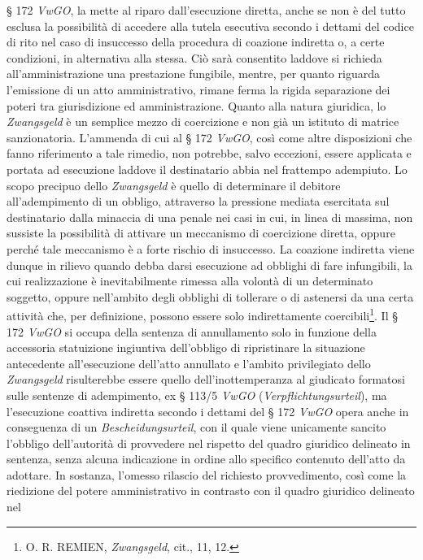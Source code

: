 \documentclass[12pt,it,a4paper,]{report}
\begin{document}
§ 172 \emph{VwGO}, la mette al riparo dall'esecuzione diretta, anche se
non è del tutto esclusa la possibilità di accedere alla tutela esecutiva
secondo i dettami del codice di rito nel caso di insuccesso della
procedura di coazione indiretta o, a certe condizioni, in alternativa
alla stessa. Ciò sarà consentito laddove si richieda all'amministrazione
una prestazione fungibile, mentre, per quanto riguarda l'emissione di un
atto amministrativo, rimane ferma la rigida separazione dei poteri tra
giurisdizione ed amministrazione. Quanto alla natura giuridica, lo
\emph{Zwangsgeld} è un semplice mezzo di coercizione e non già un
istituto di matrice sanzionatoria. L'ammenda di cui al § 172
\emph{VwGO}, così come altre disposizioni che fanno riferimento a tale
rimedio, non potrebbe, salvo eccezioni, essere applicata e portata ad
esecuzione laddove il destinatario abbia nel frattempo adempiuto. Lo
scopo precipuo dello \emph{Zwangsgeld} è quello di determinare il
debitore all'adempimento di un obbligo, attraverso la pressione mediata
esercitata sul destinatario dalla minaccia di una penale nei casi in
cui, in linea di massima, non sussiste la possibilità di attivare un
meccanismo di coercizione diretta, oppure perché tale meccanismo è a
forte rischio di insuccesso. La coazione indiretta viene dunque in
rilievo quando debba darsi esecuzione ad obblighi di fare infungibili,
la cui realizzazione è inevitabilmente rimessa alla volontà di un
determinato soggetto, oppure nell'ambito degli obblighi di tollerare o
di astenersi da una certa attività che, per definizione, possono essere
solo indirettamente coercibili\footnote{O. R. REMIEN, \emph{Zwangsgeld},
  cit., 11, 12.}. Il § 172 \emph{VwGO} si occupa della sentenza di
annullamento solo in funzione della accessoria statuizione ingiuntiva
dell'obbligo di ripristinare la situazione antecedente all'esecuzione
dell'atto annullato e l'ambito privilegiato dello \emph{Zwangsgeld}
risulterebbe essere quello dell'inottemperanza al giudicato formatosi
sulle sentenze di adempimento, ex § 113/5 \emph{VwGO}
(\emph{Verpflichtungsurteil}), ma l'esecuzione coattiva indiretta
secondo i dettami del § 172 \emph{VwGO} opera anche in conseguenza di un
\emph{Bescheidungsurteil}, con il quale viene unicamente sancito
l'obbligo dell'autorità di provvedere nel rispetto del quadro giuridico
delineato in sentenza, senza alcuna indicazione in ordine allo specifico
contenuto dell'atto da adottare. In sostanza, l'omesso rilascio del
richiesto provvedimento, così come la riedizione del potere
amministrativo in contrasto con il quadro giuridico delineato nel
\end{document}
